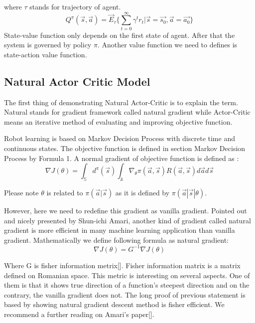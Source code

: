 \documentclass[officiallayout]{tktla}
\begin{document}
where $\tau$ stands for trajectory of agent.
\begin{equation}
Q^\pi(\vec{s}, \vec{a}) = \vec{E}_\tau\{\sum_{t=0}^\infty\gamma^tr_t|\vec{s} = \vec{s_0}, \vec{a} = \vec{a_0}\}
\end{equation}
State-value function only depends on the first state of agent. After that the system
is governed by policy $\pi$. Another value function we need to defines is state-action
value function.
\subsection{Natural Actor Critic Model}
The first thing of demonstrating Natural Actor-Critic is to explain the term. Natural
stands for gradient framework called natural gradient while Actor-Critic means an
iterative method of evaluating and improving objective function.

Robot learning is based on Markov Decision Process with discrete time and continuous
states. The objective function is defined in section Markov Decision Process
by Formula 1. A normal gradient of objective function is defined as :
\begin{equation}
\nabla J(\theta) = \int_\mathbb{S} d^\pi(\vec{s})\int_\mathbb{A}\nabla_\theta \pi(\vec{a}, \vec{s})R(\vec{a}, \vec{s})d\vec{a}d\vec{s}
\label{objective_function}
\end{equation}


Please note $\theta$ is related to $\pi(\vec{a}|\vec{s})$ as it is defined by $\pi(\vec{a}|\vec{s}|\theta)$.

However, here we need to redefine this gradient as vanilla gradient. Pointed out
and nicely presented by Shun-ichi Amari, another kind of gradient called natural
gradient is more efficient in many machine learning application than vanilla gradient.
Mathematically we define following formula as natural gradient:
\begin{equation}
\nabla J(\theta) = G^{-1}\nabla J(\theta)
\end{equation}

Where G is fisher information metrix[].
Fisher information matrix is a matrix defined on Romanian space. This metric
is interesting on several aspects. One of them is that it shows true direction of
a function's steepest direction and on the contrary, the vanilla gradient does not.
The long proof of previous statement is based by showing natural gradient descent
method is fisher efficient. We recommend a further reading on Amari's paper[].
\end{document}
